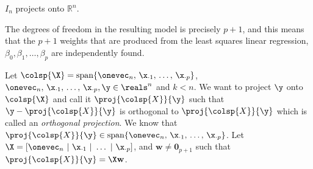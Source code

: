 \documentclass[12pt]{article}
\begin{document}
\begin{enumerate}
\begin{tcolorbox}[colback = white, sharp corners]

$I_n$ projects onto $\mathbb{R}^n$.

\end{tcolorbox}


\begin{tcolorbox}[colback = white, sharp corners]
The degrees of freedom in the resulting model is precisely $p+1$, and this means that the $p+1$ weights that are produced from the least squares linear regression, $\beta_0, \beta_1, \ldots, \beta_p$ are independently found. 
\end{tcolorbox}


\begin{tcolorbox}[colback = white, sharp corners]
Let $\colsp{\X} = \text{span}\lbrace \onevec_n, \, \x_{\cdot 1}, \, \ldots, \, \x_{\cdot p}   \rbrace$, $ \onevec_n, \, \x_{\cdot 1}, \, \ldots, \, \x_{\cdot p}, \y \in \reals^n $ and $k < n$. 
We want to project $\y$ onto $\colsp{\X}$ and call it $\proj{\colsp{X}}{\y}$ such that $\y - \proj{\colsp{X}}{\y}$ is orthogonal to $\proj{\colsp{X}}{\y}$ which is called an \emph{orthogonal projection}. 
We know that $\proj{\colsp{X}}{\y} \in \text{span}\lbrace \onevec_n, \, \x_{\cdot 1}, \, \ldots, \, \x_{\cdot p}   \rbrace$.
Let $\X = [ \onevec_n~|~\x_{\cdot 1}~|~ \ldots~|~ \x_{\cdot p} ]$, and $\mathbf{w} \neq \mathbf{0}_{p+1}$ such that $ \proj{\colsp{X}}{\y} = \X \mathbf{w}$. \\


\end{tcolorbox}
\end{enumerate}
\end{document}
